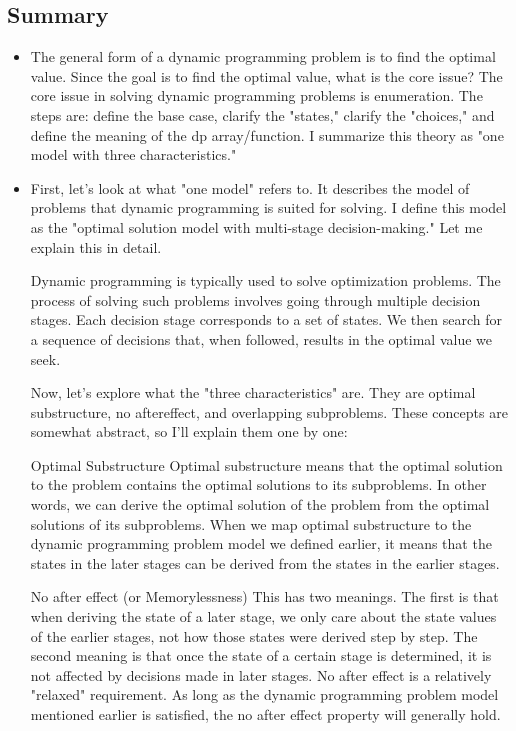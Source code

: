 \documentclass[a4paper,11pt,twoside]{book}
\begin{document}
\subsection{Summary}

\begin{itemize}
	\item The general form of a dynamic programming problem is to find the optimal value. Since the goal is to find the optimal value, what is the core issue? The core issue in solving dynamic programming problems is enumeration. The steps are: define the base case, clarify the "states," clarify the "choices," and define the meaning of the dp array/function. I summarize this theory as "one model with three characteristics."
	
	\item First, let's look at what "one model" refers to. It describes the model of problems that dynamic programming is suited for solving. I define this model as the "optimal solution model with multi-stage decision-making." Let me explain this in detail.
	
	Dynamic programming is typically used to solve optimization problems. The process of solving such problems involves going through multiple decision stages. Each decision stage corresponds to a set of states. We then search for a sequence of decisions that, when followed, results in the optimal value we seek.
	
	Now, let's explore what the "three characteristics" are. They are optimal substructure, no aftereffect, and overlapping subproblems. These concepts are somewhat abstract, so I'll explain them one by one:
	
	Optimal Substructure
	Optimal substructure means that the optimal solution to the problem contains the optimal solutions to its subproblems. In other words, we can derive the optimal solution of the problem from the optimal solutions of its subproblems. When we map optimal substructure to the dynamic programming problem model we defined earlier, it means that the states in the later stages can be derived from the states in the earlier stages.
	
	No after effect (or Memorylessness)
	This has two meanings. The first is that when deriving the state of a later stage, we only care about the state values of the earlier stages, not how those states were derived step by step. The second meaning is that once the state of a certain stage is determined, it is not affected by decisions made in later stages. No after effect is a relatively "relaxed" requirement. As long as the dynamic programming problem model mentioned earlier is satisfied, the no after effect property will generally hold.
	

\end{itemize}
\end{document}
